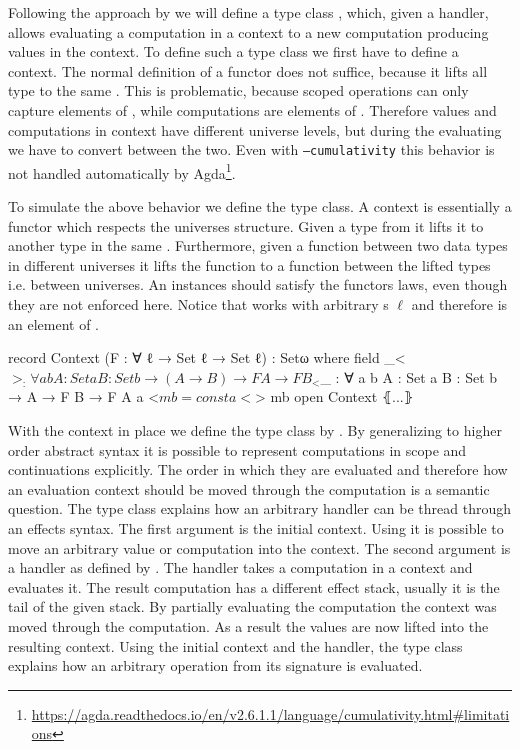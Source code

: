 Following the approach by \citeauthor{DBLP:conf/haskell/WuSH14} we will define a
type class , which, given a handler, allows evaluating a
computation in a context to a new computation producing values in the context.
To define such a type class we first have to define a context.
The normal definition of a functor does not suffice, because it lifts all type
to the same .
This is problematic, because scoped operations can only capture elements of
, while computations are elements of .
Therefore values and computations in context have different universe levels, but
during the evaluating we have to convert between the two. 
Even with \texttt{--cumulativity} this behavior is not handled automatically by
Agda\footnote{\url{https://agda.readthedocs.io/en/v2.6.1.1/language/cumulativity.html\#limitations}}.

To simulate the above behavior we define the  type class.
A context is essentially a functor which respects the universes structure.
Given a type from  it lifts it to another type in the same
.
Furthermore, given a function between two data types in different universes it
lifts the function to a function between the lifted types i.e. between
universes.
An instances should satisfy the functors laws, even though they are not enforced
here.
Notice that  works with arbitrary s
$\ell$ and therefore is an element of .

\begin{code}
record Context (F : ∀ {ℓ} → Set ℓ → Set ℓ) : Setω where
  field _<$>_ : ∀ {a b} {A : Set a} {B : Set b} → (A → B) → F A → F B
  _<$_ : ∀ {a b} {A : Set a} {B : Set b} → A → F B → F A
  a <$ mb = const a <$> mb
open Context ⦃...⦄
\end{code}
With the context in place we define the  type class by
\citeauthor{DBLP:conf/haskell/WuSH14}.
By generalizing to higher order abstract syntax it is possible to represent
computations in scope and continuations explicitly.
The order in which they are evaluated and therefore how an evaluation context
should be moved through the computation is a semantic question.
The type class explains how an arbitrary handler can be thread through an
effects syntax.
The first argument is the initial context.
Using \AgdaFunction{<\$} it is possible to move an arbitrary value or
computation into the context.
The second argument is a handler as defined by
\citeauthor{DBLP:conf/haskell/WuSH14}.
The handler takes a computation in a context and evaluates it.
The result computation has a different effect stack, usually it is the tail of
the given stack.
By partially evaluating the computation the context was moved through the
computation.
As a result the values are now lifted into the resulting context.
Using the initial context and the handler, the type class explains how an
arbitrary operation from its signature is evaluated.

